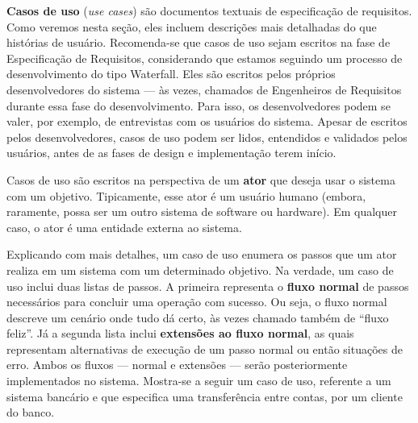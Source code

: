 \documentclass[
  11pt,
  twoside]{book}
\begin{document}
 \textbf{Casos de uso} (\emph{use cases}) são
documentos textuais de especificação de requisitos. Como veremos nesta
seção, eles incluem descrições mais detalhadas do que histórias de
usuário. Recomenda-se que casos de uso sejam escritos na fase de
Especificação de Requisitos, considerando que estamos seguindo um
processo de desenvolvimento do tipo Waterfall. Eles são escritos pelos
próprios desenvolvedores do sistema --- às vezes, chamados de
Engenheiros de Requisitos durante essa fase do desenvolvimento. Para
isso, os desenvolvedores podem se valer, por exemplo, de entrevistas com
os usuários do sistema. Apesar de escritos pelos desenvolvedores, casos
de uso podem ser lidos, entendidos e validados pelos usuários, antes de
as fases de design e implementação terem início.

 Casos de uso são escritos na perspectiva de um
\textbf{ator} que deseja usar o sistema com um objetivo. Tipicamente,
esse ator é um usuário humano (embora, raramente, possa ser um outro
sistema de software ou hardware). Em qualquer caso, o ator é uma
entidade externa ao sistema.

 
Explicando com mais detalhes, um caso de uso enumera os passos que um
ator realiza em um sistema com um determinado objetivo. Na verdade, um
caso de uso inclui duas listas de passos. A primeira representa o
\textbf{fluxo normal} de passos necessários para concluir uma operação
com sucesso. Ou seja, o fluxo normal descreve um cenário onde tudo dá
certo, às vezes chamado também de ``fluxo feliz''. Já a segunda lista
inclui \textbf{extensões ao fluxo normal}, as quais representam
alternativas de execução de um passo normal ou então situações de erro.
Ambos os fluxos --- normal e extensões --- serão posteriormente
implementados no sistema. Mostra-se a seguir um caso de uso, referente a
um sistema bancário e que especifica uma transferência entre contas, por
um cliente do banco.
\end{document}
